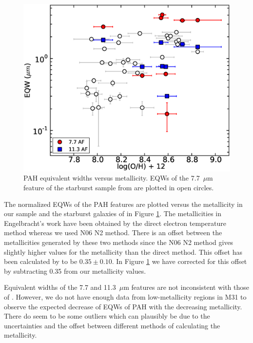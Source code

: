 \begin{figure}
\centering
\includegraphics[scale=0.27]{./oxyvseqw.eps}
\caption{ PAH equivalent widths versus metallicity. EQWs of the 7.7~$\mu$m feature of the starburst sample from \citet{Engelbracht_2008} are plotted in open circles.}
\label{metalicityVseqw}
\end{figure}

The normalized EQWs of the PAH features are plotted versus the metallicity in our sample and the starburst galaxies of \citet{Engelbracht_2008}
 in Figure \ref{metalicityVseqw}. The metallicities in Engelbracht's work have been obtained by the direct electron temperature method 
 \citep{Skillman1998} whereas we used N06 N2 method. There is an offset between the metallicities generated by these two methods 
 since the N06 N2 method gives slightly higher values for the metallicity than the direct method. 
 This offset has been calculated by \citet{Mitchel2014} to be $0.35\pm0.10$. In Figure \ref{metalicityVseqw} we have corrected for this offset 
 by subtracting 0.35 from our metallicity values. 
	
Equivalent widths of the 7.7 and 11.3~$\mu$m features are not inconsistent with those of \citet{Engelbracht_2008}. However, we do not have enough data from low-metallicity regions in M31 to observe the expected decrease of EQWs of PAH with the decreasing metallicity.  There do seem to be some outliers which 
can plausibly be due to the uncertainties  and the offset between different methods of calculating the metallicity.  

